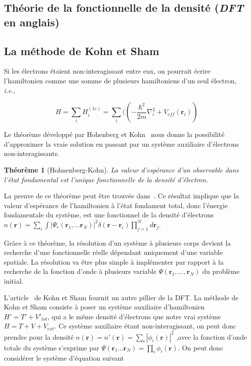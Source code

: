 \documentclass[12pt, french]{report}
\theoremstyle{theoreme}
\newtheorem{theoreme}{Théorème}
\begin{document}
\subsection{Théorie de la fonctionnelle de la densité (\textit{DFT} en anglais)}
\subsection{La méthode de Kohn et Sham}
\label{subsec-KS}
Si les électrons étaient non-interagissant entre eux, on pourrait écrire l'hamiltonien comme une somme de plusieurs hamiltoniens d'un seul électron, \textit{i.e.},

$$
H = \sum_i H_i^{(1e)} = \sum_i ((-\frac{\hbar^2}{2m}\nabla_i^2 + V_{eff}(\textbf{r}_i))
$$

Le théorème développé par Hohenberg et Kohn~\cite{Hoh64} nous donne la possibilité d'approximer la vraie solution en passant par un système auxiliaire d'électrons non-interagissants.

\begin{theoreme}[Hohnenberg-Kohn]
  La valeur d'espérance d'un observable dans l'état fondamental est l'unique fonctionnelle de la densité d'électron.
\end{theoreme}

La preuve de ce théorème peut être trouvée dans~\cite{Hoh64}.
Ce résultat implique que la valeur d'espérance de l'hamiltonien à l'état fondament total, donc l'énergie fondamentale du système, est une fonctionnel de la densité d'électrons $n(\textbf{r}) = \sum_i \int |\Psi_e(\textbf{r}_1, \ldots \textbf{r}_N) |^2 \delta (\textbf{r} - \textbf{r}_i) \prod_{j=1}^N d\textbf{r}_j$.

Grâce à ce théorème, la résolution d'un système à plusieurs corps devient la recherche d'une fonctionnelle réelle dépendant uniquement d'une variable spatiale. La résolution va être plus simple à implémenter par rapport à la recherche de la fonction d'onde à plusieurs variable $\Psi (\textbf{r}_1, \ldots, \textbf{r}_N)$ du problème initial.

L'article~\cite{Koh65} de Kohn et Sham fournit un autre pillier de la DFT. La méthode de Kohn et Sham consiste à poser un système auxiliaire d'hamiltonien $H' = T' + V'_{tot}$, qui a le même densité d'électrons que notre vrai système $H = T + V + V_{ext}$. Ce système auxiliaire étant non-interagissant, on peut donc prendre pour la densité $n(\textbf{r}) = n'(\textbf{r}) = \sum_i |\phi_i(\textbf{r})|^2$ ,avec la fonction d'onde totale du système s'exprime par $\Psi(\textbf{r}_1 \ldots \textbf{r}_N) = \prod_i \phi_i(\textbf{r})$. On peut donc considérer le système d'équation suivant
\end{document}
